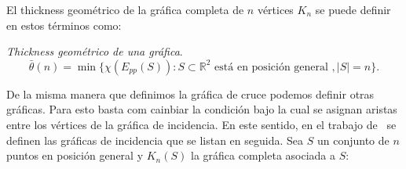 

El thickness geométrico de la gráfica completa de $n$ vértices $K_n$ se puede
definir en estos términos como:
\begin{definition}{\emph{Thickness geométrico de una gráfica}.}
  \[\bar{\theta}(n) = \min\{ \chi(E_{pp}(S)): S \subset \mathbb{R}^2 \text{ está en posición general }, |S|=n \}.\]
\end{definition}
%

De la misma manera que definimos la gráfica de cruce podemos definir otras
gráficas. Para esto basta com cainbiar la condición bajo la cual se asignan
aristas entre los vértices de la gráfica de incidencia. En este sentido, en el
trabajo de~\cite{Araujo2005} se definen las gráficas de incidencia que se listan
en seguida. Sea $S$ un conjunto de $n$ puntos en posición general y $K_n(S)$
la gráfica completa asociada a $S$:

